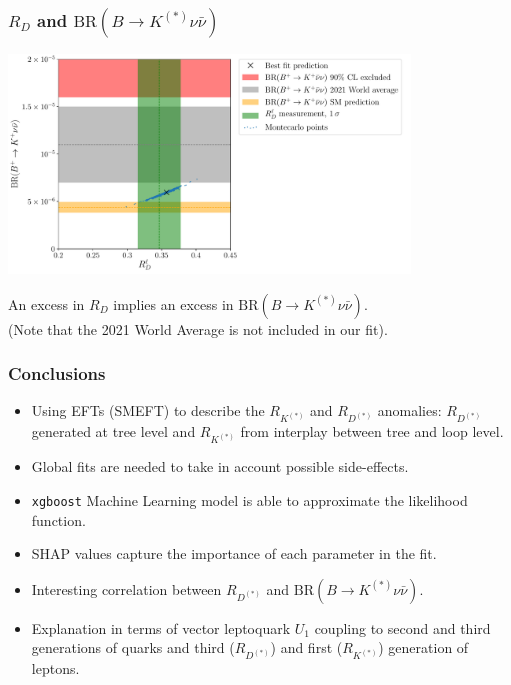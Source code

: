 \documentclass[mathserif, 10pt]{beamer}
\begin{document}
\begin{frame}
    \frametitle{$R_D$ and $\mathrm{BR}(B\to K^{(*)}\nu\bar{\nu})$}

    \begin{center}
        \includegraphics[width=0.8\textwidth]{figures/RD_BKnunu.pdf}
    \end{center}

    An excess in $R_D$ implies an excess in $\mathrm{BR}(B\to K^{(*)}\nu\bar{\nu})$. \\(Note that the {\color{gray}2021 World Average} is not included in our fit).

\end{frame}


\begin{frame}
    \frametitle{Conclusions}

    \begin{itemize}
        \item Using EFTs (SMEFT) to describe the $R_{K^{(*)}}$ and $R_{D^{(*)}}$ anomalies: $R_{D^{(*)}}$ generated at tree level and $R_{K^{(*)}}$ from interplay between tree and loop level.
        \item Global fits are needed to take in account possible side-effects. 
        \item \texttt{xgboost} Machine Learning model is able to approximate the likelihood function.
        \item SHAP values capture the importance of each parameter in the fit.
        \item Interesting correlation between $R_{D^{(*)}}$ and $\mathrm{BR}(B\to K^{(*)}\nu\bar{\nu})$.
        \item Explanation in terms of vector leptoquark $U_1$ coupling to second and third generations of quarks and third ($R_{D^{(*)}}$) and first ($R_{K^{(*)}}$) generation of leptons.
    \end{itemize}

\end{frame}
\appendix
\end{document}
